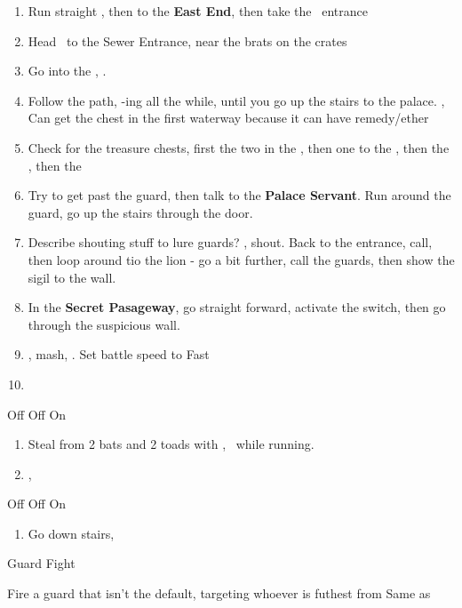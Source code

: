 \begin{enumerate}
\item Run straight \north, then \north\west to the \textbf{East End}, then take the \lowtown\ entrance \north
\item Head \north\east\ to the Sewer Entrance, near the brats on the crates
\item Go into the \waterway, \cs. \save
\item Follow the path, \flee-ing all the while, until you go up the stairs to the palace. \cs, \cs Can get the chest in the first waterway because it can have remedy/ether
\item Check for the treasure chests, first the two in the \south\east, then one to the \west, then the \north\east, then the \north\west
\item Try to get past the guard, then talk to the \textbf{Palace Servant}. Run around the guard, go up the stairs through the door.
\item Describe shouting stuff to lure guards? \south\west, shout. Back to the entrance, call, then loop around tio the lion - go a bit further, call the guards, then show the sigil to the wall.
\item In the \textbf{Secret Pasageway}, go straight forward, activate the switch, then go through the suspicious wall.
\item \cs, mash, \cs. Set battle speed to Fast
\item \leader{\fran}
\end{enumerate}
\begin{gambit}
\begin{itemize}
\vaanf Off
\franf Off
\balthier On
\end{itemize}
\end{gambit}
\begin{enumerate}
\item Steal from 2 bats and 2 toads with \vaan, \balthier\ while running.
\item \save, 
\end{enumerate}
\begin{gambit}
\begin{itemize}
\vaanf Off
\franf Off
\balthier On
\end{itemize}
\end{gambit}
\begin{enumerate}
\item Go down stairs, \cs
\end{enumerate}
\begin{battle}{Guard Fight}
\begin{itemize}
\franf Fire a guard that isn't the default, targeting whoever is futhest from \ashe
\vaanf Same as \fran
\end{itemize}
\end{battle}
